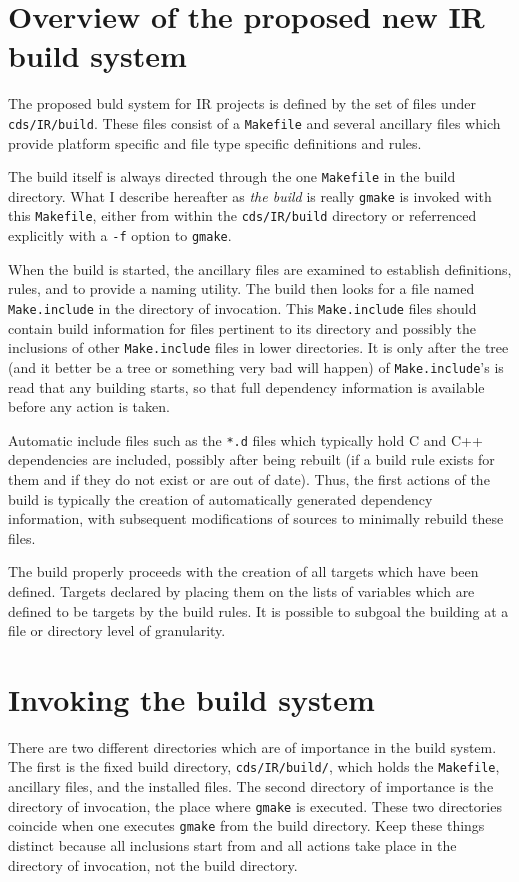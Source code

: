 \documentclass[letterpaper]{article}
\begin{document}
\section{Overview of the proposed new IR build system}

The proposed buld system for IR projects is defined by the set of
files under \verb+cds/IR/build+.  These files consist of a \verb+Makefile+
and several ancillary files which provide platform specific and file
type specific definitions and rules.

The build itself is always directed through the one \verb+Makefile+ in
the build directory.  What I describe hereafter as {\em the build} is
really \verb+gmake+ is invoked with this \verb+Makefile+, either from
within the \verb+cds/IR/build+ directory or referrenced explicitly
with a \verb+-f+ option to \verb+gmake+.

When the build is started, the ancillary files are examined to
establish definitions, rules, and to provide a naming utility.  The
build then looks for a file named \verb+Make.include+ in the directory
of invocation.  This \verb+Make.include+ files should contain build
information for files pertinent to its directory and possibly the
inclusions of other \verb+Make.include+ files in lower directories.
It is only after the tree (and it better be a tree or something very
bad will happen) of \verb+Make.include+'s is read that any building
starts, so that full dependency information is available before any
action is taken.

Automatic include files such as the \verb+*.d+ files which typically
hold C and C++ dependencies are included, possibly after being rebuilt
(if a build rule exists for them and if they do not exist or are out of
date).  Thus, the first actions of the build is typically the creation of
automatically generated dependency information, with subsequent
modifications of sources to minimally rebuild these files.

The build properly proceeds with the creation of all targets which
have been defined.  Targets declared by placing them on the lists of
variables which are defined to be targets by the build rules.  It
is possible to subgoal the building at a file or directory level of
granularity.

\section{Invoking the build system}

There are two different directories which are of importance in the
build system.  The first is the fixed build directory,
\verb+cds/IR/build/+, which holds the \verb+Makefile+, ancillary
files, and the installed files.  The second directory of importance is
the directory of invocation, the place where \verb+gmake+ is executed.
These two directories coincide when one executes \verb+gmake+ from the
build directory.  Keep these things distinct because all inclusions
start from and all actions take place in the directory of invocation,
not the build directory.
\end{document}
